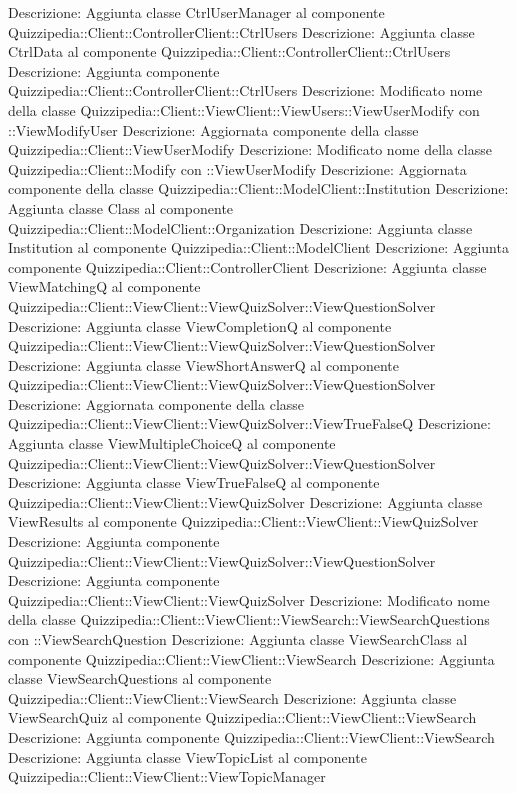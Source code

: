 Descrizione: Aggiunta classe CtrlUserManager al componente Quizzipedia::Client::ControllerClient::CtrlUsers 
Descrizione: Aggiunta classe CtrlData al componente Quizzipedia::Client::ControllerClient::CtrlUsers 
Descrizione: Aggiunta componente Quizzipedia::Client::ControllerClient::CtrlUsers 
Descrizione: Modificato nome della classe Quizzipedia::Client::ViewClient::ViewUsers::ViewUserModify con ::ViewModifyUser 
Descrizione: Aggiornata componente della classe Quizzipedia::Client::ViewUserModify 
Descrizione: Modificato nome della classe Quizzipedia::Client::Modify con ::ViewUserModify 
Descrizione: Aggiornata componente della classe Quizzipedia::Client::ModelClient::Institution 
Descrizione: Aggiunta classe Class al componente Quizzipedia::Client::ModelClient::Organization 
Descrizione: Aggiunta classe Institution al componente Quizzipedia::Client::ModelClient 
Descrizione: Aggiunta componente Quizzipedia::Client::ControllerClient 
Descrizione: Aggiunta classe ViewMatchingQ al componente Quizzipedia::Client::ViewClient::ViewQuizSolver::ViewQuestionSolver 
Descrizione: Aggiunta classe ViewCompletionQ al componente Quizzipedia::Client::ViewClient::ViewQuizSolver::ViewQuestionSolver 
Descrizione: Aggiunta classe ViewShortAnswerQ al componente Quizzipedia::Client::ViewClient::ViewQuizSolver::ViewQuestionSolver 
Descrizione: Aggiornata componente della classe Quizzipedia::Client::ViewClient::ViewQuizSolver::ViewTrueFalseQ 
Descrizione: Aggiunta classe ViewMultipleChoiceQ al componente Quizzipedia::Client::ViewClient::ViewQuizSolver::ViewQuestionSolver 
Descrizione: Aggiunta classe ViewTrueFalseQ al componente Quizzipedia::Client::ViewClient::ViewQuizSolver 
Descrizione: Aggiunta classe ViewResults al componente Quizzipedia::Client::ViewClient::ViewQuizSolver 
Descrizione: Aggiunta componente Quizzipedia::Client::ViewClient::ViewQuizSolver::ViewQuestionSolver 
Descrizione: Aggiunta componente Quizzipedia::Client::ViewClient::ViewQuizSolver 
Descrizione: Modificato nome della classe Quizzipedia::Client::ViewClient::ViewSearch::ViewSearchQuestions con ::ViewSearchQuestion 
Descrizione: Aggiunta classe ViewSearchClass al componente Quizzipedia::Client::ViewClient::ViewSearch 
Descrizione: Aggiunta classe ViewSearchQuestions al componente Quizzipedia::Client::ViewClient::ViewSearch 
Descrizione: Aggiunta classe ViewSearchQuiz al componente Quizzipedia::Client::ViewClient::ViewSearch 
Descrizione: Aggiunta componente Quizzipedia::Client::ViewClient::ViewSearch 
Descrizione: Aggiunta classe ViewTopicList al componente Quizzipedia::Client::ViewClient::ViewTopicManager 
